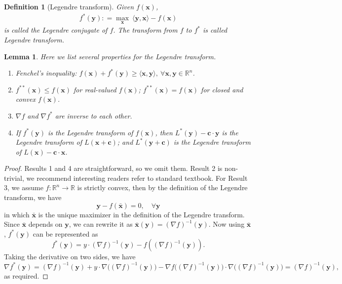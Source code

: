 \documentclass[11pt]{book}
\newtheorem{lemma}[theorem]{Lemma}
\newtheorem{definition}[theorem]{Definition}
\newcommand{\bx}{\mathbf x}
\newcommand{\by}{\mathbf y}
\begin{document}
\begin{definition}[Legendre transform]
    Given $f(\bx)$,
    \begin{align*}
        f^*(\by) : = \max_\bx \ \langle \by, \bx \rangle - f(\bx)
    \end{align*}
    is called the Legendre conjugate of $f$. The transform from $f$ to $f^*$ is called Legendre transform.
\end{definition}

\begin{lemma}\label{lemma:Legendre_properties}
    Here we list several properties for the Legendre transform.
    \begin{enumerate}
        \item Fenchel's inequality: $f(\mathbf{x})+f^*(\mathbf{y}) \ge \langle \mathbf{x}, \mathbf{y} \rangle, \ \forall \mathbf{x}, \mathbf{y} \in \mathbb{R}^n$.
        \item $f^{**}(\mathbf{x})\le f(\mathbf{x})$ for real-valued $f(\mathbf{x})$; $f^{**}(\mathbf{x}) = f(\mathbf{x})$ for closed and convex $f(\mathbf{x})$.
        \item $\nabla f$ and $\nabla f^*$ are inverse to each other.
        \item If $f^*(\mathbf{y})$ is the Legendre transform of $f(\mathbf{x})$, then $L^*(\mathbf{y})-\mathbf{c}\cdot\mathbf{y}$ is the Legendre transform of $L(\mathbf{x}+\mathbf{c})$; and $L^*(\mathbf{y}+\mathbf{c})$ is the Legendre transform of $L(\mathbf{x})-\mathbf{c}\cdot\mathbf{x}$.
    \end{enumerate}
\end{lemma}
\begin{proof}
    Results 1 and 4 are straightforward, so we omit them. Result 2 is non-trivial, we recommend interesting readers refer to standard textbook. For Result 3, we assume $f: \mathbb{R}^n\rightarrow\mathbb{R}$ is strictly convex, then by the definition of the Legendre transform, we have
    \[
      \by - f(\bar{\bx}) = 0, \quad \forall \by
    \]
    in which $\bar{\bx}$ is the unique maximizer in the definition of the Legendre transform. Since $\bar{\bx}$ depends on $\by$, we can rewrite it as $\bar{\bx}(\by) = (\nabla f)^{-1}(\by)$. Now using $\bar{\bx}$, $f^*(\by)$ can be represented as
    \[
    f^*(\by) = y\cdot(\nabla f)^{-1}(\by) - f((\nabla f)^{-1}(\by)).
    \]
    Taking the derivative on two sides, we have
    \[
    \nabla f^*(\by) = (\nabla f)^{-1}(\by) + y\cdot\nabla\Big((\nabla f)^{-1}(\by)\Big) - \nabla f\Big((\nabla f)^{-1}(\by)\Big) \cdot \nabla\Big((\nabla f)^{-1}(\by)\Big) = (\nabla f)^{-1}(\by),
    \]
    as required.
\end{proof}
\end{document}
